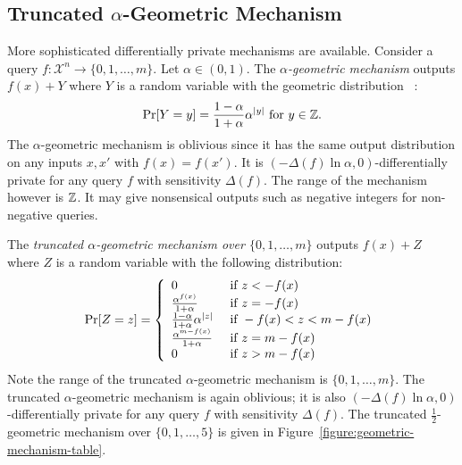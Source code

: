 \subsection{Truncated $\alpha$-Geometric Mechanism}\label{subsec:geometric}
More sophisticated differentially private mechanisms are
available. Consider a query
$f : \mathcal{X}^n \rightarrow \{ 0, 1, \ldots, m \}$. Let $\alpha \in (0, 1)$.
The \emph{$\alpha$-geometric mechanism}
outputs $f(x) + Y$ where $Y$ is a random variable with the geometric
distribution~\cite{GRS:09:UUPM,GRS:12:UUPM} :
\[
\Pr[Y = y] = \frac{1 - \alpha}{1 + \alpha}\alpha^{|y|}
\textmd{ for } y \in \mathbb{Z}.
\]
The $\alpha$-geometric mechanism is oblivious since it has the same
output distribution on any inputs $x, x'$ with $f (x) = f
(x')$. It is $(- {\Delta (f)} \ln \alpha, 0)$-differentially
private for any query $f$ with sensitivity $\Delta (f)$. The range of
the mechanism
however is $\mathbb{Z}$. It may give nonsensical outputs such as
negative integers for non-negative queries.

The \emph{truncated $\alpha$-geometric mechanism over $\{ 0, 1,
  \ldots, m \}$}
outputs $f (x) + Z$ where $Z$ is a random variable with the following
distribution:
\[
\Pr[Z = z] =
\left\{
  \begin{array}{ll}
    0 & \textmd{ if } z < - f (x) \\
    \frac{\alpha^{f (x)}}{1 + \alpha} & \textmd{ if } z = -f (x)\\
    \frac{1 - \alpha}{1 + \alpha}\alpha^{|z|} &
    \textmd{ if } -f (x) < z < m - f (x)\\
    \frac{\alpha^{m - f (x)}}{1 + \alpha} & \textmd{ if } z = m-f (x)\\
    0 & \textmd{ if } z > m - f (x)
  \end{array}
\right.
\]
Note the range of the truncated $\alpha$-geometric mechanism is
$\{ 0, 1, \ldots, m \}$. The truncated $\alpha$-geometric mechanism is
again oblivious; it is also $(- {\Delta (f)} \ln \alpha, 0)$-differentially
private for any query $f$ with sensitivity $\Delta (f)$.
The truncated $\frac{1}{2}$-geometric mechanism over $\{ 0, 1, \ldots, 5 \}$ is
given in Figure~\ref{figure:geometric-mechanism-table}.

